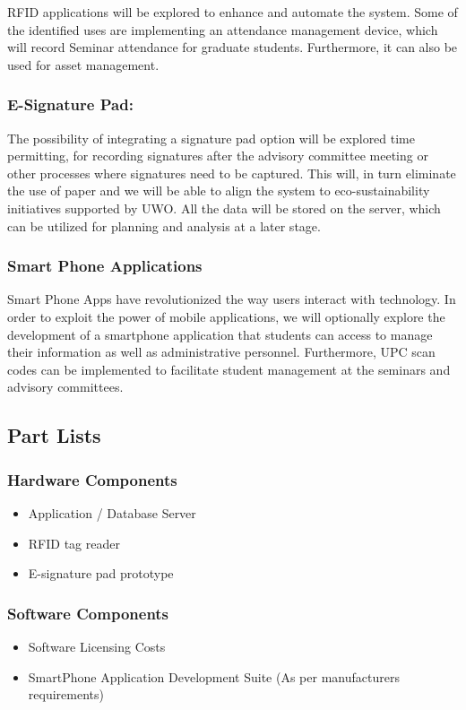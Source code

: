 \documentclass{journal}
\begin{document}
RFID applications will be explored to enhance and automate the system. Some of the identified uses are implementing an attendance management device, which will record Seminar attendance for graduate students. Furthermore, it can also be used for asset management.

\subsubsection{E-Signature Pad:} The possibility of integrating a signature pad option will be explored time permitting, for recording signatures after the advisory committee meeting or other processes where signatures need to be captured. This will, in turn eliminate the use of paper and we will be able to align the system to eco-sustainability initiatives supported by UWO. All the data will be stored on the server, which can be utilized for planning and analysis at a later stage.

\subsubsection{Smart Phone Applications} Smart Phone Apps have revolutionized the way users interact with technology. In order to exploit the power of mobile applications, we will optionally explore the development of a smartphone application that students can access to manage their information as well as administrative personnel. Furthermore, UPC scan codes can be implemented to facilitate student management at the seminars and advisory committees.

\subsection{Part Lists} 

\subsubsection{ Hardware Components }
\begin{itemize}
\item{Application / Database Server}
\item{RFID tag reader}
\item{E-signature pad prototype}
\end{itemize}

\subsubsection{ Software Components }
\begin{itemize}
\item{Software Licensing Costs }
\item{SmartPhone Application Development Suite (As per manufacturers requirements)}
\end{itemize}
\end{document}
